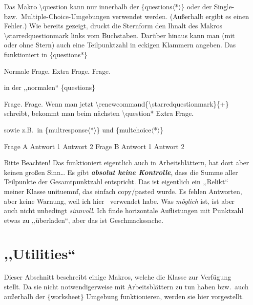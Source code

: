 \documentclass[hyperworksheet]{drcschool}
\newcommand*{\cs}[1]{\textup{\ttfamily\textbackslash#1}}                   %
\newcommand*{\str}[1]{\textup{\ttfamily\string#1}}                         %
\newcommand*{\pkg}[1]{\textup{\ttfamily#1}}                                %
\newcommand*{\env}[1]{\textup{\ttfamily\{#1\}}}                            %
\newcommand*{\optstar}{\mbox{\ttfamily$\langle$*$\rangle$}}                %
\begin{document}
\begin{test}[2,M,class=9a,date=32.\ Oktober 2022,v=A,ptspre=>,ptspost=<,logo=example-image]
\exercise[2]
Das Makro \cs{question} kann nur innerhalb der \env{questions\optstar}
oder der Single- bzw.~Multiple-Choice-Umgebungen verwendet werden.
(Außerhalb ergibt es einen Fehler.) Wie bereits gezeigt, druckt die
Sternform den Ihnalt des Makros \cs{starredquestionmark}
links vom Buchstaben. Darüber hinaus kann man (mit oder ohne Stern)
auch eine Teilpunktzahl in eckigen Klammern angeben. Das funktioniert in
\env{questions*}
\begin{questions*}{3}
\question Normale Frage.
\question* Extra Frage.
\question[1] Frage.
\end{questions*}
in der ,,normalen`` \env{questions}
\begin{questions}
\question[0,5] Frage.
\question[2] Frage. Wenn man jetzt \cs{renewcommand\{\textbackslash starredquestionmark\}\{+\}} schreibt,
bekommt man beim nächsten \cs{question*}\renewcommand*{\starredquestionmark}{+}
\question*[1,5] Extra Frage.
\end{questions}
sowie z.B.~in \env{multresponse\optstar} und  \env{multchoice\optstar}
\begin{multresponse}
\question*[1] Frage A
\choice Antwort 1
\choice* Antwort 2
\question Frage B
\choice* Antwort 1
\choice* Antwort 2
\end{multresponse}
\begin{solution}
\answer Bitte Beachten!
\answer Das funktioniert eigentlich auch in Arbeitsblättern, hat dort aber keinen großen Sinn\ldots
\answer Es gibt {\itshape\bfseries absolut keine Kontrolle}, dass die Summe aller Teilpunkte der Gesamtpunktzahl entspricht.
\answer Das ist eigentlich ein ,,Relikt`` meiner Klasse \pkg{unituemnf}, das einfach copy/pasted wurde.
\answer Es fehlen Antworten, aber keine Warnung, weil ich hier \NoCheck\str\NoCheck\ verwendet habe.
\answer Was \emph{möglich} ist, ist aber auch nicht unbedingt \emph{sinnvoll}. Ich finde
horizontale Auf{}listungen mit Punktzahl etwas zu ,,überladen``, aber das ist Geschmackssache.
\end{solution}
\end{test}


\cleardoublepage
\section{,,Utilities``}
Dieser Abschnitt beschreibt einige Makros, welche die Klasse zur Verfügung stellt.
Da sie nicht notwendigerweise mit Arbeitsblättern zu tun haben bzw.~auch außerhalb der
\env{worksheet} Umgebung funktionieren, werden sie hier vorgestellt.
\end{document}
